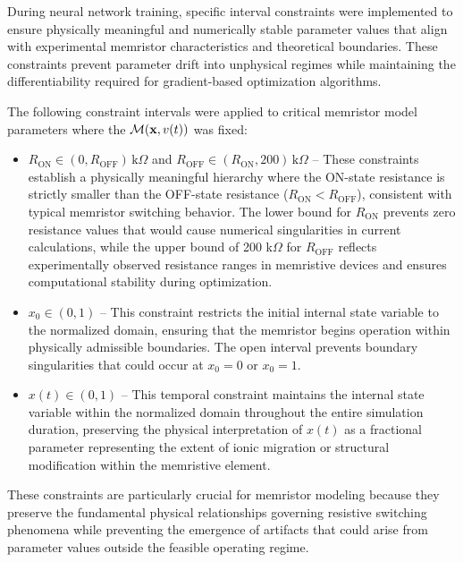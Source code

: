 \documentclass[11pt, oneside]{article}
\newcommand{\M}{\mathcal{M}}
\begin{document}
During neural network training, specific interval constraints were implemented to ensure physically meaningful and numerically stable parameter values that align with experimental memristor characteristics and theoretical boundaries. These constraints prevent parameter drift into unphysical regimes while maintaining the differentiability required for gradient-based optimization algorithms.

The following constraint intervals were applied to critical memristor model parameters where the $\M(\xvec, v(t))$ was fixed:

\begin{itemize}
    \item $R_{\mathrm{ON}} \in (0, R_{\mathrm{OFF}})\,\mathrm{k}\Omega$ and $R_{\mathrm{OFF}} \in (R_{\mathrm{ON}}, 200)\,\mathrm{k}\Omega$ – These constraints establish a physically meaningful hierarchy where the ON-state resistance is strictly smaller than the OFF-state resistance ($R_{\mathrm{ON}} < R_{\mathrm{OFF}}$), consistent with typical memristor switching behavior. The lower bound for $R_{\mathrm{ON}}$ prevents zero resistance values that would cause numerical singularities in current calculations, while the upper bound of 200 k$\Omega$ for $R_{\mathrm{OFF}}$ reflects experimentally observed resistance ranges in memristive devices and ensures computational stability during optimization.


    \item $x_0 \in (0, 1)$ – This constraint restricts the initial internal state variable to the normalized domain, ensuring that the memristor begins operation within physically admissible boundaries. The open interval prevents boundary singularities that could occur at $x_0 = 0$ or $x_0 = 1$.

    \item $x(t) \in (0, 1)$ – This temporal constraint maintains the internal state variable within the normalized domain throughout the entire simulation duration, preserving the physical interpretation of $x(t)$ as a fractional parameter representing the extent of ionic migration or structural modification within the memristive element.
\end{itemize}

These constraints are particularly crucial for memristor modeling because they preserve the fundamental physical relationships governing resistive switching phenomena while preventing the emergence of artifacts that could arise from parameter values outside the feasible operating regime.
\end{document}
